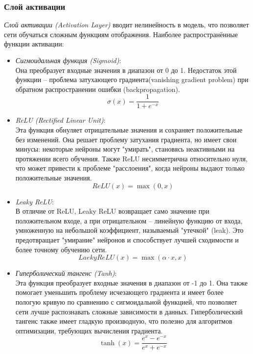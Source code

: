 \subsubsection{Слой активации}
\par \textit{Слой активации (Activation Layer)} вводит нелинейность в модель, что позволяет сети обучаться сложным функциям отображения. 
Наиболее распространённые функции активации:
\begin{itemize}[]
	\item \textit{Сигмоидальная функция (Sigmoid)}:\\
	Она преобразует входные значения в диапазон от 0 до 1. Недостаток этой функции – проблема затухающего градиента(vanishing gradient problem) при обратном распространении ошибки (backpropagation).
	\begin{equation}
		\sigma(x) = \frac{1}{1+e^{-x}}
	\end{equation}
	\item \textit{ReLU (Rectified Linear Unit)}:\\
	Эта функция обнуляет отрицательные значения и сохраняет положительные без изменений. Она решает проблему затухания градиента, но имеет свои минусы: некоторые нейроны могут "умирать", становясь неактивными на протяжении всего обучения. Также ReLU несимметрична относительно нуля, что может привести к проблеме "расслоения", когда нейроны выдают только положительные значения.
	\begin{equation}
		ReLU(x) = \max(0, x)
	\end{equation}
	\item \textit{Leaky ReLU}:\\
	В отличие от ReLU, Leaky ReLU возвращает само значение при положительном входе, а при отрицательном – линейную функцию от входа, умноженную на небольшой коэффициент, называемый "утечкой" (leak). Это предотвращает "умирание" нейронов и способствует лучшей сходимости и более точному обучению сети.
	\begin{equation}
		Laeky ReLU(x) = \max(\alpha\cdot x, x)
	\end{equation}
	\item \textit{Гиперболический тангенс (Tanh)}:\\
	Эта функция преобразует входные значения в диапазон от -1 до 1. Она также помогает уменьшить проблему исчезающего градиента и имеет более пологую кривую по сравнению с сигмоидальной функцией, что позволяет сети лучше распознавать сложные зависимости в данных. Гиперболический тангенс также имеет гладкую производную, что полезно для алгоритмов оптимизации, требующих вычисления градиента.
	\begin{equation}
		\tanh(x) = \frac{e^x-e^{-x}}{e^x+e^{-x}}
	\end{equation}
\end{itemize}

